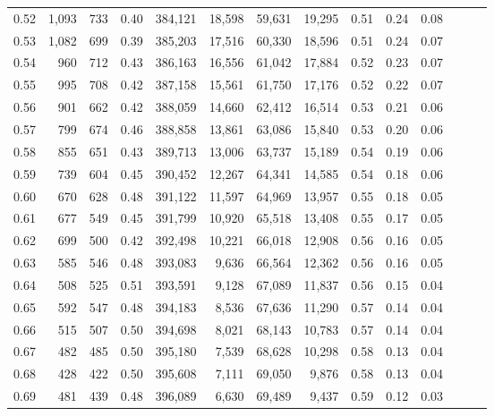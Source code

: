 \begin{tabular}{rrrrrrrrrrrrrr}
0.52 &   1,093 &    733 &  0.40 &  384,121 &   18,598 &  59,631 &  19,295 &  0.51 &  0.24 &      0.08 \\
0.53 &   1,082 &    699 &  0.39 &  385,203 &   17,516 &  60,330 &  18,596 &  0.51 &  0.24 &      0.07 \\
0.54 &     960 &    712 &  0.43 &  386,163 &   16,556 &  61,042 &  17,884 &  0.52 &  0.23 &      0.07 \\
0.55 &     995 &    708 &  0.42 &  387,158 &   15,561 &  61,750 &  17,176 &  0.52 &  0.22 &      0.07 \\
0.56 &     901 &    662 &  0.42 &  388,059 &   14,660 &  62,412 &  16,514 &  0.53 &  0.21 &      0.06 \\
0.57 &     799 &    674 &  0.46 &  388,858 &   13,861 &  63,086 &  15,840 &  0.53 &  0.20 &      0.06 \\
0.58 &     855 &    651 &  0.43 &  389,713 &   13,006 &  63,737 &  15,189 &  0.54 &  0.19 &      0.06 \\
0.59 &     739 &    604 &  0.45 &  390,452 &   12,267 &  64,341 &  14,585 &  0.54 &  0.18 &      0.06 \\
0.60 &     670 &    628 &  0.48 &  391,122 &   11,597 &  64,969 &  13,957 &  0.55 &  0.18 &      0.05 \\
0.61 &     677 &    549 &  0.45 &  391,799 &   10,920 &  65,518 &  13,408 &  0.55 &  0.17 &      0.05 \\
0.62 &     699 &    500 &  0.42 &  392,498 &   10,221 &  66,018 &  12,908 &  0.56 &  0.16 &      0.05 \\
0.63 &     585 &    546 &  0.48 &  393,083 &    9,636 &  66,564 &  12,362 &  0.56 &  0.16 &      0.05 \\
0.64 &     508 &    525 &  0.51 &  393,591 &    9,128 &  67,089 &  11,837 &  0.56 &  0.15 &      0.04 \\
0.65 &     592 &    547 &  0.48 &  394,183 &    8,536 &  67,636 &  11,290 &  0.57 &  0.14 &      0.04 \\
0.66 &     515 &    507 &  0.50 &  394,698 &    8,021 &  68,143 &  10,783 &  0.57 &  0.14 &      0.04 \\
0.67 &     482 &    485 &  0.50 &  395,180 &    7,539 &  68,628 &  10,298 &  0.58 &  0.13 &      0.04 \\
0.68 &     428 &    422 &  0.50 &  395,608 &    7,111 &  69,050 &   9,876 &  0.58 &  0.13 &      0.04 \\
0.69 &     481 &    439 &  0.48 &  396,089 &    6,630 &  69,489 &   9,437 &  0.59 &  0.12 &      0.03 \\

\end{tabular}
